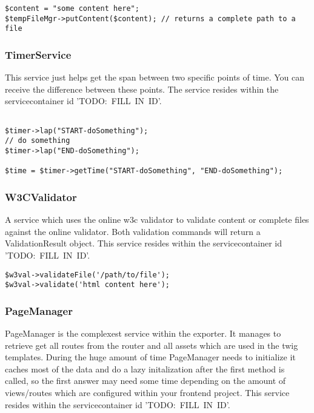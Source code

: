 \begin{verbatim}
$content = "some content here";
$tempFileMgr->putContent($content); // returns a complete path to a file
\end{verbatim}

\subsubsection{TimerService}
This service just helps get the span between two specific points of time. You can receive the difference between these points. The service resides within the servicecontainer id \mbox{'TODO: FILL IN ID'}.

\begin{verbatim}

$timer->lap("START-doSomething");
// do something
$timer->lap("END-doSomething");

$time = $timer->getTime("START-doSomething", "END-doSomething");
\end{verbatim}

\subsubsection{W3CValidator}
A service which uses the online w3c validator to validate content or complete files against the online validator. Both validation commands will return a ValidationResult object. This service resides within the servicecontainer id \mbox{'TODO: FILL IN ID'}.

\begin{verbatim}
$w3val->validateFile('/path/to/file');
$w3val->validate('html content here');
\end{verbatim}

\subsubsection{PageManager}
PageManager is the complexest service within the exporter. It manages to retrieve get all routes from the router and all assets which are used in the twig templates. During the huge amount of time PageManager needs to initialize it caches most of the data and do a lazy initalization after the first method is called, so the first answer may need some time depending on the amount of views/routes which are configured within your frontend project. This service resides within the servicecontainer id \mbox{'TODO: FILL IN ID'}.

